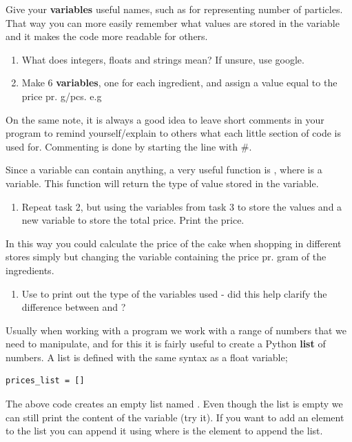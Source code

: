 \documentclass{article}
\begin{document}
Give your {\bf variables} useful names, such as  for representing number of particles.
That way you can more easily remember what values are stored in the variable and it makes the code more readable for others.

\begin{enumerate}[resume]
    \item What does integers, floats and strings mean? If unsure, use google.
    \item Make 6 {\bf variables}, one for each ingredient, and assign a value equal to the price pr. g/pcs. e.g 
\end{enumerate}

On the same note, it is always a good idea to leave short comments in your program to remind yourself/explain to others what each little section of code is used for.
Commenting is done by starting the line with \#.

Since a variable can contain anything, a very useful function is , where  is a variable.
This function will return the type of value stored in the variable.

\begin{enumerate}[resume]
    \item Repeat task 2, but using the variables from task 3 to store the values and a new variable to store the total price. Print the price.
\end{enumerate}

In this way you could calculate the price of the cake when shopping in different stores simply but changing the variable containing the price pr. gram of the ingredients. 

\begin{enumerate}[resume]
    \item Use  to print out the type of the variables used - did this help clarify the difference between  and ?
\end{enumerate}

Usually when working with a program we work with a range of numbers that we need to manipulate, and for this it is fairly useful to create a Python {\bf list} of numbers.
A list is defined with the same syntax as a float variable;

\begin{lstlisting}
prices_list = []
\end{lstlisting}

The above code creates an empty list named .
Even though the list is empty we can still print the content of the variable (try it).
If you want to add an element to the list you can append it using  where  is the element to append the list.
\end{document}
